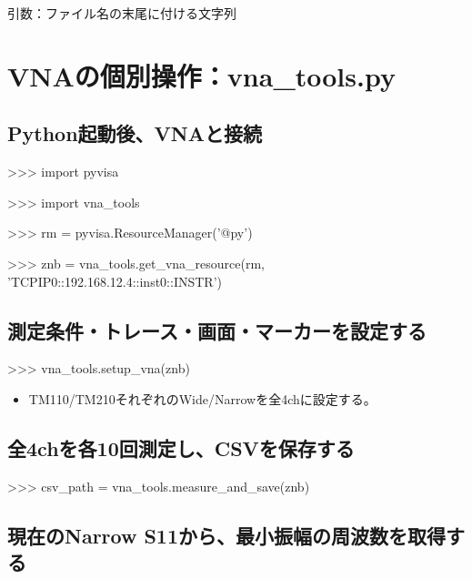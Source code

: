 \documentclass[a4paper,11pt]{ltjsarticle}
\begin{document}
引数：ファイル名の末尾に付ける文字列


\section{VNAの個別操作：vna\_tools.py}

\subsection{Python起動後、VNAと接続}

\begin{command}

>>> import pyvisa

>>> import vna_tools

>>> rm = pyvisa.ResourceManager('@py')

>>> znb = vna_tools.get_vna_resource(rm, 'TCPIP0::192.168.12.4::inst0::INSTR')

\end{command}

\subsection{測定条件・トレース・画面・マーカーを設定する}

\begin{command}

>>> vna_tools.setup_vna(znb)

\end{command}

\begin{itemize}

\item TM110/TM210それぞれのWide/Narrowを全4chに設定する。

\end{itemize}

\subsection{全4chを各10回測定し、CSVを保存する}

\begin{command}

>>> csv_path = vna_tools.measure_and_save(znb)

\end{command}

\subsection{現在のNarrow S11から、最小振幅の周波数を取得する}
\end{document}
